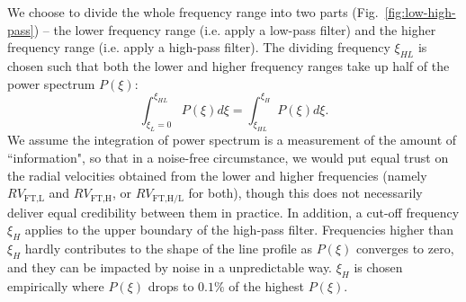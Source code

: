 We choose to divide the whole frequency range into two parts (Fig.~\ref{fig:low-high-pass}) -- the lower frequency range (i.e. apply a low-pass filter) and the higher frequency range (i.e. apply a high-pass filter). The dividing frequency $\xi_{HL}$ is chosen such that both the lower and higher frequency ranges take up half of the power spectrum $P(\xi)$:
\begin{equation}
	\int_{\xi_{L}=0}^{\xi_{HL}} P(\xi) d\xi = \int_{\xi_{HL}}^{\xi_{H}} P(\xi) d\xi. 
\end{equation}
We assume the integration of power spectrum is a measurement of the amount of ``information", so that in a noise-free circumstance, we would put equal trust on the radial velocities obtained from the lower and higher frequencies (namely $RV_\text{FT,L}$ and $RV_\text{FT,H}$, or $RV_\text{FT,H/L}$ for both), though this does not necessarily deliver equal credibility between them in practice. In addition, a cut-off frequency $\xi_{H}$ applies to the upper boundary of the high-pass filter. Frequencies higher than $\xi_{H}$ hardly contributes to the shape of the line profile as $P(\xi)$ converges to zero, and they can be impacted by noise in a unpredictable way. $\xi_{H}$ is chosen empirically where $P(\xi)$ drops to $0.1\%$ of the highest $P(\xi)$.

